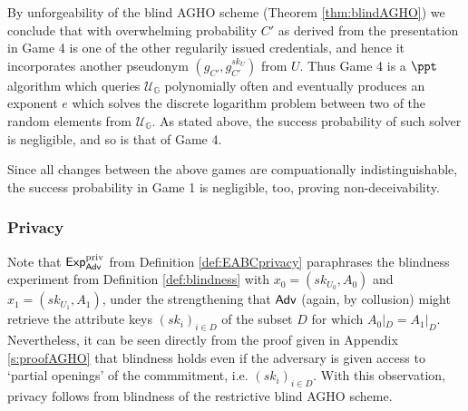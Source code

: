By unforgeability of the blind AGHO scheme (Theorem \ref{thm:blindAGHO}) we conclude that with overwhelming probability $C'$ as derived from the presentation in Game 4 is one of the other regularily issued credentials, and hence it incorporates another pseudonym $(g_{C'}, g_{C'}^{sk_U})$ from $U$.
Thus Game 4 is a $\ppt$ algorithm which queries $\mathcal U_{\mathbb G}$ polynomially often and eventually produces an exponent $e$ which solves the discrete logarithm problem between two of the random elements from $\mathcal U_{\mathbb G}$.
As stated above, the success probability of such solver is negligible, and so is that of Game 4.

Since all changes between the above games are compuationally indistinguishable, the success probability in Game 1 is negligible, too, proving non-deceivability.
 
 
 
\subsubsection{Privacy}
Note that $\operatorname{\mathsf{Exp}_{\mathsf{Adv}}^{priv}}$ from Definition \ref{def:EABCprivacy} paraphrases the blindness experiment from Definition \ref{def:blindness} with $x_0= (sk_{U_0},A_0)$ and $x_1=(sk_{U_1},A_1)$, under the strengthening that $\mathsf{Adv}$ (again, by collusion) might retrieve the attribute keys $(sk_i)_{i\in D}$ of the subset $D$ for which $A_0|_D = A_1|_D$.
Nevertheless, it can be seen directly from the proof given in Appendix \ref{s:proofAGHO} that blindness holds even if the adversary is given access to `partial openings' of the commmitment, i.e. $(sk_i)_{i\in D}$.
With this observation, privacy follows from blindness of the restrictive blind AGHO scheme.


